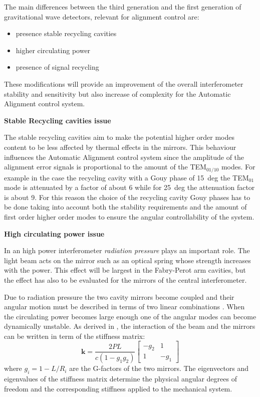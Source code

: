 The main differences between the third generation and the first generation of gravitational wave
 detectors,  relevant for alignment control are: 
 \begin{itemize}
 \item presence stable recycling cavities
 \item higher circulating power
 \item presence of  signal recycling
 \end{itemize}
These modifications will provide an improvement of the overall interferometer stability and sensitivity but also 
increase of complexity for the  Automatic Alignment control system.

\textbf{Stable Recycling cavities issue}

The stable recycling cavities aim to make the potential higher order modes content to be less affected by 
 thermal effects in the mirrors. This behaviour influences the Automatic Alignment control system since the amplitude of 
the alignment error signals is proportional to the amount of the TEM$_{01/10}$ modes. 
For example in the case the recycling cavity with a Gouy phase of 15~deg the TEM$_{01}$ mode is attenuated
 by a factor of about 6 while for 25~deg the attenuation factor is about 9.
For this reason the choice of the recycling cavity Gouy phases has to be done taking into account both the 
stability requirements and the amount of first order higher order modes to ensure the angular controllability of the system. 
 
 
\textbf{High circulating power issue} 

In an high power interferometer \textit{radiation pressure} plays an important role. The light beam acts on the mirror 
such as an optical spring whose strength increases with the power. This effect will be largest in the Fabry-Perot arm cavities,
but the effect has also to be  evaluated for the mirrors of  the central
 interferometer.  

Due to radiation pressure the two cavity mirrors
 become coupled and their angular motion must be described in terms of two linear combinations \cite{sidles-sigg}. 
When the circulating power becomes large enough one of the angular modes can become dynamically unstable. 
As derived in \cite{sidles-sigg}, the interaction of the beam and the mirrors can be written in term of the stiffness matrix:
\begin{equation}
\mathbf{k} = \frac{2PL}{c(1 - g_1 g_2)} \left[ \begin{array}{cc} -g_2 & 1 \\ 1 & -g_1\end{array}\right]
\end{equation}
where $g_i = 1 - L/R_i$ are the G-factors of the two mirrors. The eigenvectors and eigenvalues of the stiffness matrix 
determine the physical angular degrees of freedom and the corresponding stiffness applied to the mechanical system. 

